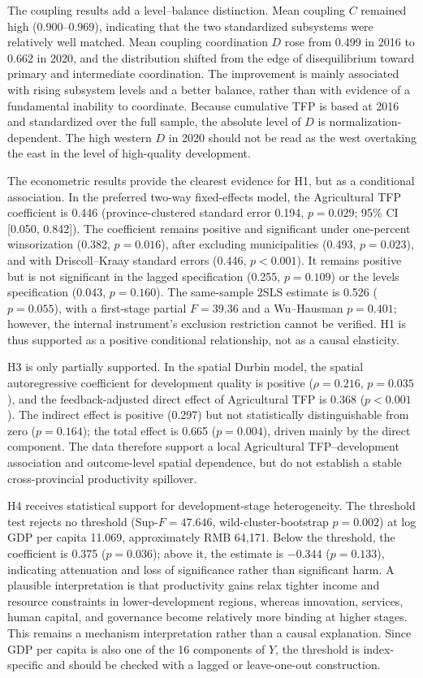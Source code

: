 \documentclass[sustainability,article,submit,moreauthors]{Definitions/mdpi}
\numberwithin{equation}{section}
\begin{document}
The coupling results add a level--balance distinction. Mean coupling $C$
remained high (0.900--0.969), indicating that the two standardized subsystems
were relatively well matched. Mean coupling coordination $D$ rose from 0.499
in 2016 to 0.662 in 2020, and the distribution shifted from the edge of
disequilibrium toward primary and intermediate coordination. The improvement
is mainly associated with rising subsystem levels and a better balance, rather
than with evidence of a fundamental inability to coordinate. Because cumulative
TFP is based at 2016 and standardized over the full sample, the absolute level
of $D$ is normalization-dependent. The high western $D$ in 2020 should not be
read as the west overtaking the east in the level of high-quality development.

The econometric results provide the clearest evidence for H1, but as a
conditional association. In the preferred two-way fixed-effects model, the
Agricultural TFP coefficient is 0.446 (province-clustered standard error
0.194, $p=0.029$; 95\% CI [0.050, 0.842]). The coefficient remains positive and
significant under one-percent winsorization (0.382, $p=0.016$), after
excluding municipalities (0.493, $p=0.023$), and with Driscoll--Kraay standard
errors (0.446, $p<0.001$). It remains positive but is not significant in the
lagged specification (0.255, $p=0.109$) or the levels specification (0.043,
$p=0.160$). The same-sample 2SLS estimate is 0.526 ($p=0.055$), with a
first-stage partial $F=39.36$ and a Wu--Hausman $p=0.401$; however, the internal
instrument's exclusion restriction cannot be verified. H1 is thus supported as
a positive conditional relationship, not as a causal elasticity.

H3 is only partially supported. In the spatial Durbin model, the spatial
autoregressive coefficient for development quality is positive
($\rho=0.216$, $p=0.035$), and the feedback-adjusted direct effect of
Agricultural TFP is 0.368 ($p<0.001$). The indirect effect is positive (0.297)
but not statistically distinguishable from zero ($p=0.164$); the total effect
is 0.665 ($p=0.004$), driven mainly by the direct component. The data therefore
support a local Agricultural TFP--development association and outcome-level
spatial dependence, but do not establish a stable cross-provincial productivity
spillover.

H4 receives statistical support for development-stage heterogeneity. The
threshold test rejects no threshold (Sup-$F=47.646$, wild-cluster-bootstrap
$p=0.002$) at log GDP per capita 11.069, approximately RMB 64,171. Below the
threshold, the coefficient is 0.375 ($p=0.036$); above it, the estimate is
$-0.344$ ($p=0.133$), indicating attenuation and loss of significance rather
than significant harm. A plausible interpretation is that productivity gains
relax tighter income and resource constraints in lower-development regions,
whereas innovation, services, human capital, and governance become relatively
more binding at higher stages. This remains a mechanism interpretation rather
than a causal explanation. Since GDP per capita is also one of the 16
components of $Y$, the threshold is index-specific and should be checked with
a lagged or leave-one-out construction.
\end{document}
